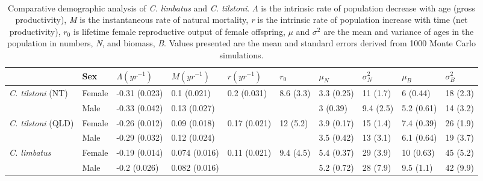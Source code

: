 \documentclass[]{article}
\begin{document}
\newpage \begin{landscape}
\
\
\begin{table}[ht]
\centering
\caption{Comparative demographic analysis of \textit{C. limbatus} and \textit{C. tilstoni}. $\Lambda$ is the intrinsic rate of population decrease with age (gross productivity), \textit{M} is the instantaneous rate of natural mortality, \textit{r} is the intrinsic rate of population increase with time (net productivity), $r_{0}$ is lifetime female reproductive output of female offspring, $\mu$ and $\sigma^2$ are the mean and variance of ages in the population in numbers, \textit{N}, and biomass, \textit{B}. Values presented are the mean and standard errors derived from 1000 Monte Carlo simulations.} 
\begin{tabular}{llllllllll}
  \toprule
   & Sex & $\Lambda (yr^{-1})$ & $M (yr^{-1})$ & $r (yr^{-1})$ & $r_{0}$ & $\mu_N$ & $\sigma^2_N$ & $\mu_B$ & $\sigma^2_B$ \\ 
  \midrule
\textit{C. tilstoni} (NT) & Female & -0.31 (0.023) & 0.1 (0.021) & 0.2 (0.031) & 8.6 (3.3) & 3.3 (0.25) & 11 (1.7) & 6 (0.44) & 18 (2.3) \\ 
   & Male & -0.33 (0.042) & 0.13 (0.027) &  &  & 3 (0.39) & 9.4 (2.5) & 5.2 (0.61) & 14 (3.2) \\ 
  \textit{C. tilstoni} (QLD) & Female & -0.26 (0.012) & 0.09 (0.018) & 0.17 (0.021) & 12 (5.2) & 3.9 (0.17) & 15 (1.4) & 7.4 (0.39) & 26 (1.9) \\ 
   & Male & -0.29 (0.032) & 0.12 (0.024) &  &  & 3.5 (0.42) & 13 (3.1) & 6.1 (0.64) & 19 (3.7) \\ 
  \textit{C. limbatus} & Female & -0.19 (0.014) & 0.074 (0.016) & 0.11 (0.021) & 9.4 (4.5) & 5.4 (0.37) & 29 (3.9) & 10 (0.63) & 45 (5.2) \\ 
   & Male & -0.2 (0.026) & 0.082 (0.016) &  &  & 5.2 (0.72) & 28 (7.9) & 9.5 (1.1) & 42 (9.9) \\ 
   \bottomrule
\end{tabular}
\end{table}

\end{landscape}
\end{document}
